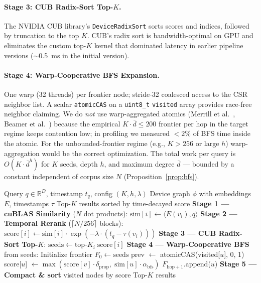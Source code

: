 \documentclass[11pt]{article}
\newcommand{\mars}{\textsc{Mars}}
\begin{document}
\paragraph{Stage 3: CUB Radix-Sort Top-$K$.}
The NVIDIA CUB library's \texttt{DeviceRadixSort} sorts scores and
indices, followed by truncation to the top $K$. CUB's radix sort is
bandwidth-optimal on GPU and eliminates the custom top-$K$ kernel that
dominated latency in earlier pipeline versions ($\sim$0.5~ms in the initial version).

\paragraph{Stage 4: Warp-Cooperative BFS Expansion.}
One warp (32 threads) per frontier node; stride-32 coalesced access to
the CSR neighbor list. A scalar \texttt{atomicCAS} on a
\texttt{uint8\_t} \texttt{visited} array provides race-free neighbor
claiming. We do \emph{not} use warp-aggregated atomics
(Merrill et al.~\cite{merrill2012}, Beamer et al.~\cite{beamer2012})
because the empirical $K \cdot \bar{d} \le 200$ frontier per hop in
the target regime keeps contention low; in profiling we measured
$<\!2\%$ of BFS time inside the atomic. For the unbounded-frontier
regime (e.g., $K{>}256$ or large $h$) warp-aggregation would be the
correct optimization. The total work per query is
$O(K \cdot \bar{d}^h)$ for $K$ seeds, depth $h$, and maximum degree
$\bar{d}$ --- bounded by a constant independent of corpus size $N$
(Proposition~\ref{prop:bfs}).

\begin{algorithm}[t]
\caption{\mars{} GPU-Resident Retrieval Pipeline}
\label{alg:pipeline}
\begin{algorithmic}[1]
\REQUIRE Query $q \in \mathbb{R}^D$, timestamp $t_q$, config $(K, h, \lambda)$
\REQUIRE Device graph $\phi$ with embeddings $E$, timestamps $\tau$
\ENSURE Top-$K$ results sorted by time-decayed score
\STATE \textbf{Stage 1 --- cuBLAS Similarity} ($N$ dot products):
    \STATE $\text{sim}[i] \leftarrow \langle E(v_i), q \rangle$
\ENDFOR
\STATE \textbf{Stage 2 --- Temporal Rerank} ($\lceil N/256 \rceil$ blocks):
    \STATE $\text{score}[i] \leftarrow \text{sim}[i] \cdot \exp(-\lambda \cdot (t_q - \tau(v_i)))$
\ENDFOR
\STATE \textbf{Stage 3 --- CUB Radix-Sort Top-$K$}:
\STATE $\text{seeds} \leftarrow \text{top-}K_{i} \; \text{score}[i]$
\STATE \textbf{Stage 4 --- Warp-Cooperative BFS} from seeds:
\STATE Initialize frontier $F_0 \leftarrow \text{seeds}$
            \STATE prev $\leftarrow$ atomicCAS(visited[$u$], 0, 1)
                \STATE score[$u$] $\leftarrow \max(\text{score}[v] \cdot \delta_{\text{prop}},\; \text{sim}[u] \cdot \alpha_{\text{bfs}})$
                \STATE $F_{\text{hop}+1}$.append($u$)
            \ENDIF
        \ENDFOR
    \ENDFOR
\ENDFOR
\STATE \textbf{Stage 5 --- Compact \& sort} visited nodes by score
\RETURN Top-$K$ results
\end{algorithmic}
\end{algorithm}
\end{document}

